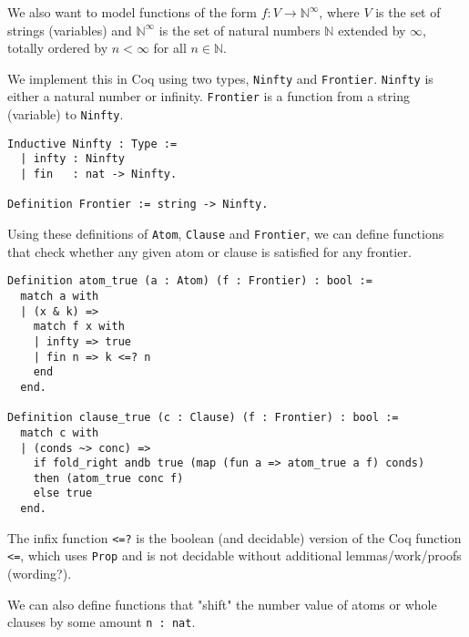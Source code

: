 We also want to model functions of the form $f : V \rightarrow \mathbb{N}^{\infty}$, where $V$ is the set of strings (variables)
and $\mathbb{N}^{\infty}$ is the set of natural numbers $\mathbb{N}$
extended by $\infty$, totally ordered by $n < \infty$ for all $n \in \mathbb{N}$.

We implement this in Coq using two types, \lstinline{Ninfty} and \lstinline{Frontier}.
\lstinline{Ninfty} is either a natural number or infinity.
\lstinline{Frontier} is a function from a string (variable) to \lstinline{Ninfty}.

\begin{minipage}{\linewidth}
\begin{lstlisting}[language=Coq, label={lst:ninfty_frontier_def}, caption={Def. of \lstinline{Ninfty} and \lstinline{Frontier} in Coq}]
Inductive Ninfty : Type :=
  | infty : Ninfty
  | fin   : nat -> Ninfty.

Definition Frontier := string -> Ninfty.
\end{lstlisting}
\end{minipage}

Using these definitions of \lstinline{Atom}, \lstinline{Clause} and \lstinline{Frontier},
we can define functions that check whether any given atom or clause is satisfied for any frontier.

\begin{minipage}{\linewidth}
\begin{lstlisting}[language=Coq, label={lst:atom_clause_true_def}, caption={Def. of \lstinline{atom_true} and \lstinline{clause_true} in Coq}]
Definition atom_true (a : Atom) (f : Frontier) : bool :=
  match a with
  | (x & k) =>
    match f x with
    | infty => true
    | fin n => k <=? n
    end
  end.

Definition clause_true (c : Clause) (f : Frontier) : bool :=
  match c with
  | (conds ~> conc) =>
    if fold_right andb true (map (fun a => atom_true a f) conds)
    then (atom_true conc f)
    else true
  end.
\end{lstlisting}
\end{minipage}

The infix function \lstinline{<=?} is the boolean (and decidable) version of the
Coq function \lstinline{<=}, which uses \lstinline{Prop} and is not decidable without
additional lemmas/work/proofs (wording?).

We can also define functions that "shift" the number value of atoms or whole clauses by some amount \lstinline{n : nat}.

